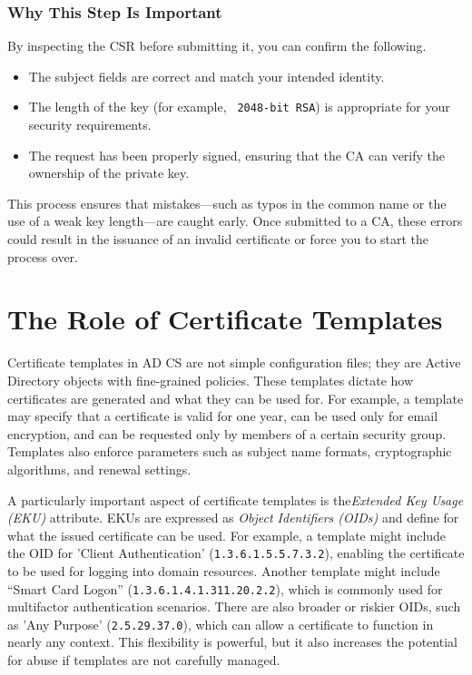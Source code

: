 \subsubsection{Why This Step Is Important}
By inspecting the CSR before submitting it, you can confirm the following.

\begin{itemize}
    \item The subject fields are correct and match your intended identity.
    \item The length of the key (for example, \texttt{ 2048-bit RSA}) is appropriate for your security requirements.
    \item The request has been properly signed, ensuring that the CA can verify the ownership of the private key.
\end{itemize}
This process ensures that mistakes—such as typos in the common name or the use of a weak key length—are caught early. Once submitted to a CA, these errors could result in the issuance of an invalid certificate or force you to start the process over.

 

 






\section{The Role of Certificate Templates}
Certificate templates in AD CS are not simple configuration files; they are Active Directory objects with fine-grained policies. These templates dictate how certificates are generated and what they can be used for. For example, a template may specify that a certificate is valid for one year, can be used only for email encryption, and can be requested only by members of a certain security group. Templates also enforce parameters such as subject name formats, cryptographic algorithms, and renewal settings.

A particularly important aspect of certificate templates is the\textit{Extended Key Usage (EKU)} attribute. EKUs are expressed as \textit{Object Identifiers (OIDs)} and define for what the issued certificate can be used. For example, a template might include the OID for 'Client Authentication' (\texttt{1.3.6.1.5.5.7.3.2}), enabling the certificate to be used for logging into domain resources. Another template might include “Smart Card Logon” (\texttt{1.3.6.1.4.1.311.20.2.2}), which is commonly used for multifactor authentication scenarios. There are also broader or riskier OIDs, such as 'Any Purpose' (\texttt{2.5.29.37.0}), which can allow a certificate to function in nearly any context. This flexibility is powerful, but it also increases the potential for abuse if templates are not carefully managed.

